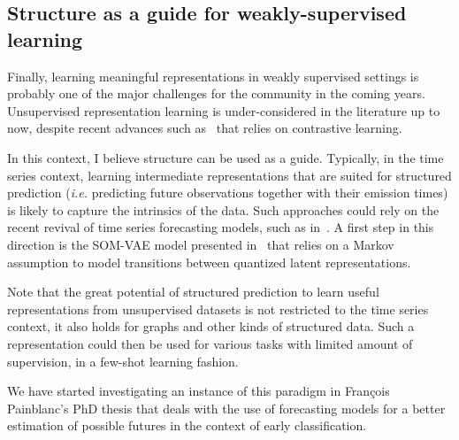 \subsection{Structure as a guide for weakly-supervised learning}

Finally, learning meaningful representations in weakly supervised settings is
probably one of the major challenges for the community in the coming years.
Unsupervised representation learning is under-considered in the
literature up to now, despite recent advances such
as~\cite{franceschi2019unsupervised} that relies on contrastive learning.

In this context, I believe structure can
be used as a guide.
Typically, in the time series context, learning intermediate representations
that are suited for structured prediction (\emph{i.e.} predicting future
observations together with their emission times) is likely to capture the
intrinsics of the data.
Such approaches could rely on the recent revival of time series forecasting
models, such as in~\cite{vincent2019shape,rubanova2019latent}.
A first step in this direction is the SOM-VAE model presented
in~\cite{fortuin2019som} that relies on a Markov assumption to model
transitions between quantized latent representations.

Note that the great potential of structured prediction to learn useful
representations from unsupervised datasets is not restricted to the time series
context, it also holds for graphs and other kinds of structured data.
Such a representation could then be used for various tasks with limited amount
of supervision, in a few-shot learning fashion.

We have started investigating an instance of this paradigm in François
Painblanc's PhD thesis that deals with the use of forecasting models for a
better estimation of possible futures in the context of early classification.
